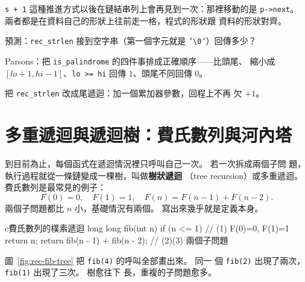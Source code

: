\texttt{s + 1} 這種推進方式以後在鏈結串列上會再見到一次：那裡移動的是
\texttt{p->next}。 兩者都是在資料自己的形狀上往前走一格，程式的形狀跟
資料的形狀對齊。

\begin{drills}[label=drills:rec-string]
\item 預測：\texttt{rec\_strlen} 接到空字串（第一個字元就是
\texttt{'\textbackslash 0'}）回傳多少？
\item Parsons：把 \texttt{is\_palindrome} 的四件事排成正確順序——比頭尾、
縮小成 $[lo+1,hi-1]$、\texttt{lo >= hi} 回傳 $1$、頭尾不同回傳 $0$。
\item 把 \texttt{rec\_strlen} 改成尾遞迴：加一個累加器參數，回程上不再
欠 $+1$。
\end{drills}

\section{多重遞迴與遞迴樹：費氏數列與河內塔}
\label{sec:rec-fib-hanoi}

到目前為止，每個函式在遞迴情況裡只呼叫自己一次。 若一次拆成兩個子問
題，執行過程就從一條鏈變成一棵樹，叫做\textbf{樹狀遞迴}
（tree recursion）或多重遞迴。 費氏數列是最常見的例子：
\[
F(0) = 0,\quad F(1) = 1,\quad F(n) = F(n-1) + F(n-2).
\]
兩個子問題都比 $n$ 小，基礎情況有兩個。 寫出來幾乎就是定義本身。

\begin{code}{c}{費氏數列的樸素遞迴}
long long fib(int n) {
    if (n <= 1) {                    // (1) F(0)=0, F(1)=1
        return n;
    }
    return fib(n - 1) + fib(n - 2);  // (2)(3) 兩個子問題
}
\end{code}

圖~\ref{fig:rec-fib-tree} 把 \texttt{fib(4)} 的呼叫全部畫出來。 同一
個 \texttt{fib(2)} 出現了兩次，\texttt{fib(1)} 出現了三次。 樹愈往下
長，重複的子問題愈多。

